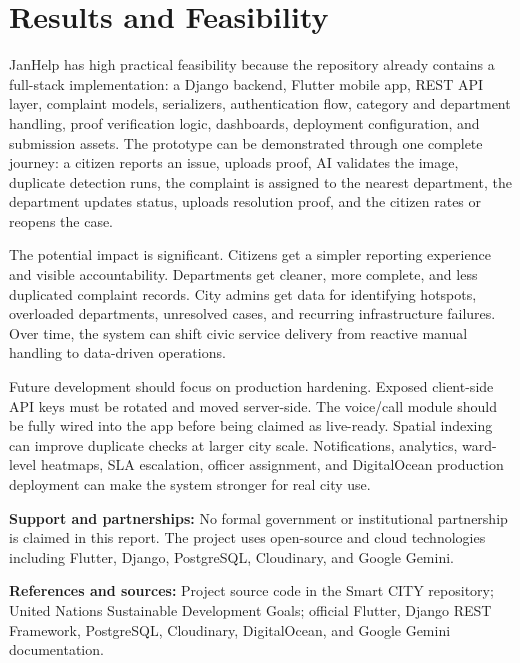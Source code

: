 \documentclass[11pt,a4paper]{article}
\begin{document}
\section*{Results and Feasibility}
JanHelp has high practical feasibility because the repository already contains a full-stack implementation: a Django backend, Flutter mobile app, REST API layer, complaint models, serializers, authentication flow, category and department handling, proof verification logic, dashboards, deployment configuration, and submission assets. The prototype can be demonstrated through one complete journey: a citizen reports an issue, uploads proof, AI validates the image, duplicate detection runs, the complaint is assigned to the nearest department, the department updates status, uploads resolution proof, and the citizen rates or reopens the case.

The potential impact is significant. Citizens get a simpler reporting experience and visible accountability. Departments get cleaner, more complete, and less duplicated complaint records. City admins get data for identifying hotspots, overloaded departments, unresolved cases, and recurring infrastructure failures. Over time, the system can shift civic service delivery from reactive manual handling to data-driven operations.

Future development should focus on production hardening. Exposed client-side API keys must be rotated and moved server-side. The voice/call module should be fully wired into the app before being claimed as live-ready. Spatial indexing can improve duplicate checks at larger city scale. Notifications, analytics, ward-level heatmaps, SLA escalation, officer assignment, and DigitalOcean production deployment can make the system stronger for real city use.

\textbf{Support and partnerships:} No formal government or institutional partnership is claimed in this report. The project uses open-source and cloud technologies including Flutter, Django, PostgreSQL, Cloudinary, and Google Gemini.

\textbf{References and sources:} Project source code in the Smart CITY repository; United Nations Sustainable Development Goals; official Flutter, Django REST Framework, PostgreSQL, Cloudinary, DigitalOcean, and Google Gemini documentation.
\end{document}
